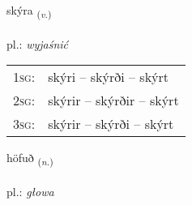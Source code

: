 \documentclass[frontgrid, backgrid]{flacards}\usepackage[]{graphicx}\usepackage[]{xcolor}
\begin{document}
\renewcommand{\flhead}{\vskip5pt \fboxsep=0pt {\small\bfseries\footnotesize Sagnorð | czasownik}}
\renewcommand{\fcfoot}{\vskip5pt \fboxsep=0pt \hspace{2pt}{\small\bfseries\footnotesize 1K}}

\renewcommand{\blhead}{\vskip5pt {\small\bfseries\footnotesize Sagnorð | czasownik }}
\renewcommand{\bcfoot}{\vskip5pt \hspace{2pt}{\small\bfseries\footnotesize 1K}}


{skýra \small{\textsubscript{(\textit{v.})}} \\[1ex] %
\textphonetic{[sciːra]} \\
pl.: \emph{wyjaśnić} \\  [2ex]
\renewcommand*{\arraystretch}{0.8}
\begin{tabular}{p{1cm}l}
\textsc{1sg}: & skýri -- skýrði -- skýrt \\ 
\textsc{2sg}: & skýrir -- skýrðir -- skýrt \\ 
\textsc{3sg}: & skýrir -- skýrði -- skýrt \\ 
\end{tabular}
}

\renewcommand{\flhead}{\vskip5pt \fboxsep=0pt {\small\bfseries\footnotesize Nafnorð | rzeczownik}}
\renewcommand{\fcfoot}{\vskip5pt \fboxsep=0pt \hspace{2pt}{\small\bfseries\footnotesize 1K}}

\renewcommand{\blhead}{\vskip5pt {\small\bfseries\footnotesize Nafnorð | rzeczownik }}
\renewcommand{\bcfoot}{\vskip5pt \hspace{2pt}{\small\bfseries\footnotesize 1K}}


{höfuð \small{\textsubscript{(\textit{n.})}} \\[1ex] %
\textphonetic{[hœːvʏð]} \\
pl.: \emph{głowa} \\  [2ex]
\renewcommand*{\arraystretch}{0.8}
}
\end{document}
